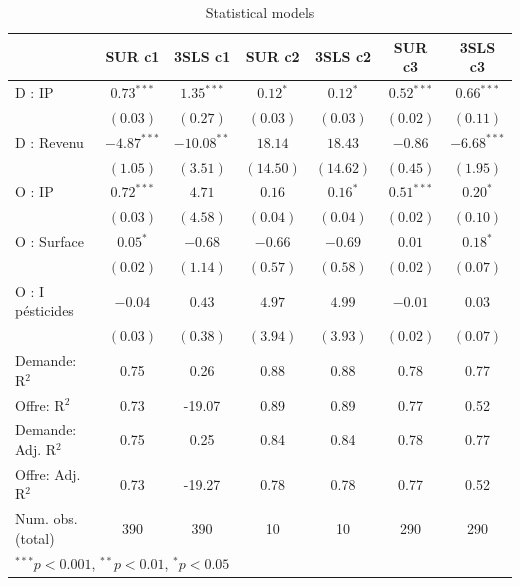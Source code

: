 \documentclass[11pt,]{article}
\begin{document}
\begin{table}[!htbp]
\begin{center}
\begin{tabular}{l c c c c c c }
\hline
 & SUR c1 & 3SLS c1 & SUR c2 & 3SLS c2 & SUR c3 & 3SLS c3 \\
\hline
D : IP              & $0.73^{***}$  & $1.35^{***}$  & $0.12^{*}$ & $0.12^{*}$ & $0.52^{***}$ & $0.66^{***}$  \\
                    & $(0.03)$      & $(0.27)$      & $(0.03)$   & $(0.03)$   & $(0.02)$     & $(0.11)$      \\
D : Revenu          & $-4.87^{***}$ & $-10.08^{**}$ & $18.14$    & $18.43$    & $-0.86$      & $-6.68^{***}$ \\
                    & $(1.05)$      & $(3.51)$      & $(14.50)$  & $(14.62)$  & $(0.45)$     & $(1.95)$      \\
O : IP              & $0.72^{***}$  & $4.71$        & $0.16$     & $0.16^{*}$ & $0.51^{***}$ & $0.20^{*}$    \\
                    & $(0.03)$      & $(4.58)$      & $(0.04)$   & $(0.04)$   & $(0.02)$     & $(0.10)$      \\
O : Surface         & $0.05^{*}$    & $-0.68$       & $-0.66$    & $-0.69$    & $0.01$       & $0.18^{*}$    \\
                    & $(0.02)$      & $(1.14)$      & $(0.57)$   & $(0.58)$   & $(0.02)$     & $(0.07)$      \\
O : I pésticides    & $-0.04$       & $0.43$        & $4.97$     & $4.99$     & $-0.01$      & $0.03$        \\
                    & $(0.03)$      & $(0.38)$      & $(3.94)$   & $(3.93)$   & $(0.02)$     & $(0.07)$      \\
\hline
Demande: R$^2$      & 0.75          & 0.26          & 0.88       & 0.88       & 0.78         & 0.77          \\
Offre: R$^2$        & 0.73          & -19.07        & 0.89       & 0.89       & 0.77         & 0.52          \\
Demande: Adj. R$^2$ & 0.75          & 0.25          & 0.84       & 0.84       & 0.78         & 0.77          \\
Offre: Adj. R$^2$   & 0.73          & -19.27        & 0.78       & 0.78       & 0.77         & 0.52          \\
Num. obs. (total)   & 390           & 390           & 10         & 10         & 290          & 290           \\
\hline
\multicolumn{7}{l}{\scriptsize{$^{***}p<0.001$, $^{**}p<0.01$, $^*p<0.05$}}
\end{tabular}
\caption{Statistical models}
\label{table : sur et 3sls clusters}
\end{center}
\end{table}
\end{document}
